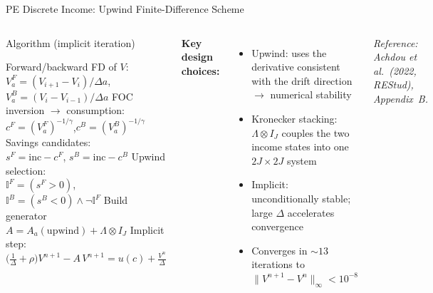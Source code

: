 \documentclass[aspectratio=169,11pt]{beamer}
\newcommand{\emphc}[1]{\textcolor{harvardcrimson}{#1}}
\begin{document}
\begin{frame}{PE Discrete Income: Upwind Finite-Difference Scheme}
\small
\begin{columns}[T]
\begin{block}{Algorithm (implicit iteration)}
\begin{algorithmic}[1]
  \STATE Forward/backward FD of $V$:\\
         $V_a^F=(V_{i+1}-V_i)/\Delta a$,\;
         $V_a^B=(V_i-V_{i-1})/\Delta a$
  \STATE FOC inversion $\to$ consumption:\\
         $c^F=(V_a^F)^{-1/\gamma}$,\;$c^B=(V_a^B)^{-1/\gamma}$
  \STATE Savings candidates:\\
         $s^F=\text{inc}-c^F$,\; $s^B=\text{inc}-c^B$
  \STATE \emphc{Upwind selection}:\\
         $\mathbb{I}^F\!=\!(s^F\!>\!0)$,\;
         $\mathbb{I}^B\!=\!(s^B\!<\!0)\wedge\neg\mathbb{I}^F$
  \STATE Build generator\\
         $A = A_a(\text{upwind}) + \Lambda\otimes I_J$
  \STATE Implicit step:\\
         $\bigl(\tfrac{1}{\Delta}+\rho\bigr)V^{n+1}\!-\!A\,V^{n+1}=u(c)+\tfrac{V^n}{\Delta}$
\end{algorithmic}
\end{block}

\textbf{Key design choices:}
\begin{itemize}\itemsep2pt
  \item \emphc{Upwind}: uses the derivative consistent with the drift direction $\to$ numerical stability
  \item \emphc{Kronecker stacking}: $\Lambda\otimes I_J$ couples the two income states into one $2J\times 2J$ system
  \item \emphc{Implicit}: unconditionally stable; large $\Delta$ accelerates convergence
  \item Converges in ${\sim}13$ iterations to $\|V^{n+1}-V^n\|_\infty < 10^{-8}$
\end{itemize}

\vspace{0.2em}
{\scriptsize\textit{Reference: Achdou et al.\ (2022, REStud), Appendix~B.}}
\end{columns}
\end{frame}
\end{document}

